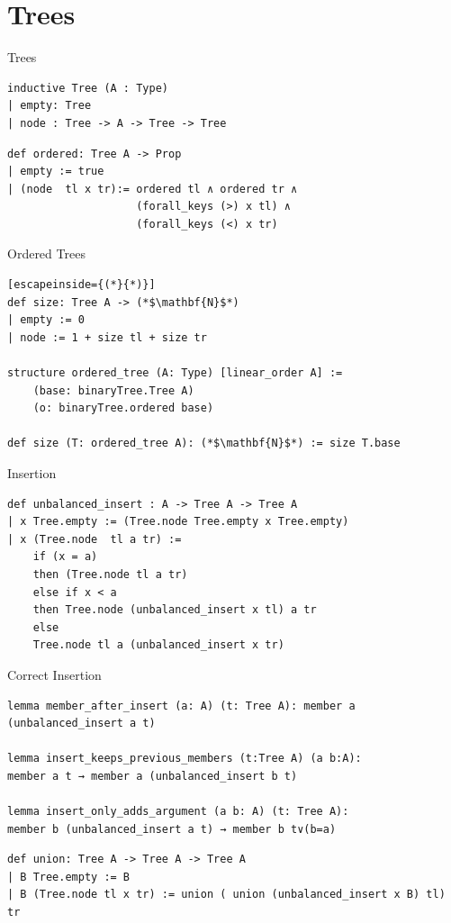 \documentclass[aspectratio=169]{beamer}
\begin{document}
    \section{Trees}
    \begin{frame}[fragile]{Trees}
        \begin{lstlisting}
inductive Tree (A : Type)
| empty: Tree 
| node : Tree -> A -> Tree -> Tree
        \end{lstlisting}
    \pause
    \begin{lstlisting}[caption=ordered from {\cite{avl}}]
def ordered: Tree A -> Prop
| empty := true
| (node  tl x tr):= ordered tl ∧ ordered tr ∧ 
                    (forall_keys (>) x tl) ∧ 
                    (forall_keys (<) x tr)

    \end{lstlisting}
    \end{frame}
    \begin{frame}[fragile]{Ordered Trees}
        \begin{lstlisting}[escapeinside={(*}{*)}]
def size: Tree A -> (*$\mathbf{N}$*)
| empty := 0
| node := 1 + size tl + size tr

structure ordered_tree (A: Type) [linear_order A] := 
    (base: binaryTree.Tree A) 
    (o: binaryTree.ordered base)

def size (T: ordered_tree A): (*$\mathbf{N}$*) := size T.base
        \end{lstlisting}

    
    \end{frame}
    \begin{frame}[fragile]{Insertion}
        \begin{lstlisting}[aboveskip=0pt, belowskip=0pt]
def unbalanced_insert : A -> Tree A -> Tree A
| x Tree.empty := (Tree.node Tree.empty x Tree.empty)
| x (Tree.node  tl a tr) := 
    if (x = a)
    then (Tree.node tl a tr)
    else if x < a 
    then Tree.node (unbalanced_insert x tl) a tr
    else
    Tree.node tl a (unbalanced_insert x tr)
        \end{lstlisting}
    \end{frame}
    \begin{frame}[fragile]{Correct Insertion}
        \begin{lstlisting}[aboveskip=0pt, belowskip=0pt]
lemma member_after_insert (a: A) (t: Tree A): member a (unbalanced_insert a t)

lemma insert_keeps_previous_members (t:Tree A) (a b:A): 
member a t → member a (unbalanced_insert b t)

lemma insert_only_adds_argument (a b: A) (t: Tree A): 
member b (unbalanced_insert a t) → member b t∨(b=a)
        \end{lstlisting}
    \pause
    \begin{lstlisting}[aboveskip=0pt, belowskip=0pt]
def union: Tree A -> Tree A -> Tree A
| B Tree.empty := B
| B (Tree.node tl x tr) := union ( union (unbalanced_insert x B) tl) tr

    \end{lstlisting}

    \end{frame}
\end{document}
